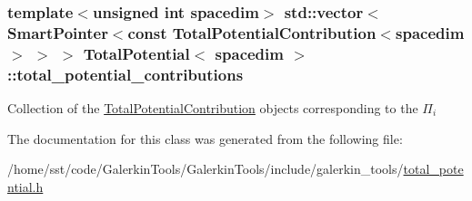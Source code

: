 \subsubsection[{\texorpdfstring{total\+\_\+potential\+\_\+contributions}{total_potential_contributions}}]{\setlength{\rightskip}{0pt plus 5cm}template$<$unsigned int spacedim$>$ std\+::vector$<$ {\bf Smart\+Pointer}$<$const {\bf Total\+Potential\+Contribution}$<$spacedim$>$ $>$ $>$ {\bf Total\+Potential}$<$ spacedim $>$\+::total\+\_\+potential\+\_\+contributions\hspace{0.3cm}{\ttfamily [private]}}\hypertarget{class_total_potential_a5a14ce0e2fabf8116566aa67fb11db35}{}\label{class_total_potential_a5a14ce0e2fabf8116566aa67fb11db35}
Collection of the \hyperlink{class_total_potential_contribution}{Total\+Potential\+Contribution} objects corresponding to the $\Pi_i$ 

The documentation for this class was generated from the following file\+:\begin{DoxyCompactItemize}
\item 
/home/sst/code/\+Galerkin\+Tools/\+Galerkin\+Tools/include/galerkin\+\_\+tools/\hyperlink{total__potential_8h}{total\+\_\+potential.\+h}\end{DoxyCompactItemize}
